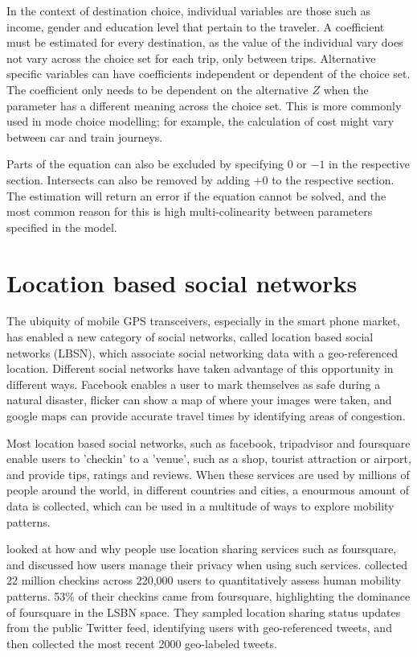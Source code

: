 In the context of destination choice, individual variables are those such as income, gender and education level that pertain to the traveler. A coefficient must be estimated for every destination, as the value of the individual vary does not vary across the choice set for each trip, only between trips. Alternative specific variables can have coefficients independent or dependent of the choice set. The coefficient only needs to be dependent on the alternative $Z$ when the parameter has a different meaning across the choice set. This is more commonly used in mode choice modelling; for example, the calculation of cost might vary between car and train journeys.

Parts of the equation can also be excluded by specifying $0$ or $-1$ in the respective section. Intersects can also be removed by adding $+ 0$ to the respective section. The estimation will return an error if the equation cannot be solved, and the most common reason for this is high multi-colinearity between parameters specified in the model.

\section{Location based social networks}
The ubiquity of mobile GPS transceivers, especially in the smart phone market, has enabled a new category of social networks, called location based social networks (LBSN), which associate social networking data with a geo-referenced location. Different social networks have taken advantage of this opportunity in different ways. Facebook enables a user to mark themselves as safe during a natural disaster, flicker can show a map of where your images were taken, and google maps can provide accurate travel times by identifying areas of congestion. 

Most location based social networks, such as facebook, tripadvisor and foursquare enable users to 'checkin' to a 'venue', such as a shop, tourist attraction or airport, and provide tips, ratings and reviews. When these services are used by millions of people around the world, in different countries and cities, a enourmous amount of data is collected, which can be used in a multitude of ways to explore mobility patterns. 

\textcite{lindqvist2011m} looked at how and why people use location sharing services such as foursquare, and discussed how users manage their privacy when using such services. \autocite{cheng2011exploring} collected 22 million checkins across 220,000 users to quantitatively assess human mobility patterns. 53\% of their checkins came from foursquare, highlighting the dominance of foursquare in the LSBN space. They sampled location sharing status updates from the public Twitter feed, identifying users with geo-referenced tweets, and then collected the most recent 2000 geo-labeled tweets.

